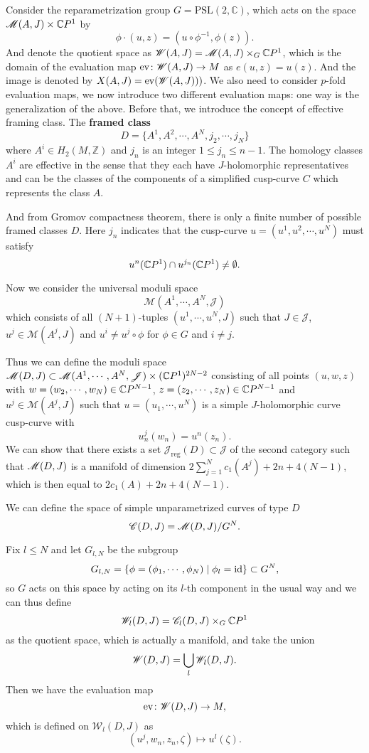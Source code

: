 \documentclass[twoside]{article}
\begin{document}
Consider the reparametrization group $G=\mathrm{PSL}(2,\mathbb{C})$,
which acts on the space $\mathscr{M}(A,J)\times \mathbb{C}P^{1}$ by  %
\[\phi \cdot(u,z)=(u\circ \phi^{-1},\phi(z)). \]
And denote the quotient space as $\mathscr{W}(A,J)=\mathscr{M}(A,J)\times_G \mathbb{C}P^{1}$, 
which is the domain of the evaluation map $\mathrm{ev}\colon \mathscr{W}(A,J)\rightarrow M$ as $e(u,z)=u(z)$. 
And the image is denoted by $X(A,J)=\mathrm{ev}(\mathscr{W}(A,J)))$.
We also need to consider $p$-fold evaluation maps, we now introduce two different evaluation maps: 
one way is the generalization of the above. 
Before that, we introduce the concept of effective framing class.
The \textbf{framed class}
\[D=\{A^1,A^2,\cdots,A^N,j_2,\cdots,j_N \}\]
where $A^i\in H_2(M,\mathbb{Z})$ and $j_n$ is an integer $1\leq j_n\leq n-1$. 
The homology classes $A^i$ are effective in the sense that 
they each have $J$-holomorphic representatives 
and can be the classes of the components of a simplified cusp-curve $C$ which represents the class $A$.

And from Gromov compactness theorem, 
there is only a finite number of possible framed classes $D$. 
Here $j_n$ indicates that the cusp-curve $u=(u^1,u^2,\cdots,u^N)$ must satisfy
\[u^n(\mathbb{C}P^{1})\cap u^{j_n}(\mathbb{C}P^{1})\neq \emptyset.\]

Now we consider the universal moduli space
\[\mathscr{M}(A^1,\cdots,A^N,\mathscr{J})\]
which consists of all $(N+1)$-tuples $(u^1,\cdots,u^N,J)$ such that $J\in\mathscr{J}$, $u^j\in \mathscr{M}(A^j,J)$ 
and $u^i\neq u^j\circ \phi$ for $\phi\in G$ and $i\neq j$.

Thus we can define the moduli space 
$\mathscr{M}(D,J)\subset \mathscr{M}(A^1,\cdots,A^N,\mathscr{J})\times (\mathbb{C}P^{1})^{2N-2}$ 
consisting of all points $(u,w,z)$ with $w=(w_2,\cdots,w_N)\in\mathbb{C}P^{N-1}$, 
$z=(z_2,\cdots,z_N)\in\mathbb{C}P^{N-1}$ and $u^j\in \mathscr{M}(A^j,J)$ such that 
$u=(u_1,\cdots,u^N)$ is a simple $J$-holomorphic curve cusp-curve with
\[u^j_n(w_n)=u^n(z_n).\]
We can show that there exists a set $\mathscr{J}_{\mathrm{reg}}(D)\subset \mathscr{J}$ 
of the second category such that $\mathscr{M}(D,J)$ is a manifold of dimension $2\sum_{j=1}^{N}c_1(A^j)+2n+4(N-1)$, 
which is then equal to $2c_1(A)+2n+4(N-1)$.

We can define the space of simple unparametrized curves of type $D$
\[\mathscr{C}(D,J)=\mathscr{M}(D,J)/G^N.\]

Fix $l\leq N$ and let $G_{l,N}$ be the subgroup
\[G_{l,N}=\{\phi=(\phi_1,\cdots,\phi_N) \mid \phi_l=\operatorname{id}  \}\subset G^N,\]
so $G$ acts on this space by acting on its $l$-th component in the usual way and we can thus define
\[\mathscr{W}_l(D,J)=\mathscr{C}_l(D,J)\times_G \mathbb{C}P^{1}\]
as the quotient space, which is actually a manifold, and take the union
\[\mathscr{W}(D,J)=\bigcup_l \mathscr{W}_l(D,J).\]
Then we have the evaluation map
\[\mathrm{ev}\colon \mathscr{W}(D,J)\rightarrow M,\]
which is defined on $\mathscr{W}_l(D,J)$ as
\[(u^j,w_n,z_n,\zeta)\mapsto u^l(\zeta).\]
\end{document}
